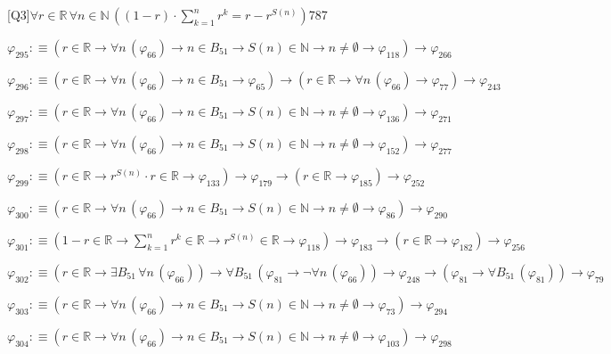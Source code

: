 \begin{fullproof}{[Q3]}{$\forall r \in \mathbb{R}\,\forall n \in \mathbb{N}\,((1 - r) \cdot {\textstyle\sum_{k=1}^{n} {{r}^{k}}} = r - {{r}^{S(n)}})$}{787}
\begin{abbrevlist}
\item $\varphi_{295} :\equiv (r \in \mathbb{R} \to \forall n\,(\varphi_{66}) \to n \in B_{51} \to S(n) \in \mathbb{N} \to n \neq \emptyset \to \varphi_{118}) \to \varphi_{266}$
\item $\varphi_{296} :\equiv (r \in \mathbb{R} \to \forall n\,(\varphi_{66}) \to n \in B_{51} \to \varphi_{65}) \to (r \in \mathbb{R} \to \forall n\,(\varphi_{66}) \to \varphi_{77}) \to \varphi_{243}$
\item $\varphi_{297} :\equiv (r \in \mathbb{R} \to \forall n\,(\varphi_{66}) \to n \in B_{51} \to S(n) \in \mathbb{N} \to n \neq \emptyset \to \varphi_{136}) \to \varphi_{271}$
\item $\varphi_{298} :\equiv (r \in \mathbb{R} \to \forall n\,(\varphi_{66}) \to n \in B_{51} \to S(n) \in \mathbb{N} \to n \neq \emptyset \to \varphi_{152}) \to \varphi_{277}$
\item $\varphi_{299} :\equiv (r \in \mathbb{R} \to {{r}^{S(n)}} \cdot r \in \mathbb{R} \to \varphi_{133}) \to \varphi_{179} \to (r \in \mathbb{R} \to \varphi_{185}) \to \varphi_{252}$
\item $\varphi_{300} :\equiv (r \in \mathbb{R} \to \forall n\,(\varphi_{66}) \to n \in B_{51} \to S(n) \in \mathbb{N} \to n \neq \emptyset \to \varphi_{86}) \to \varphi_{290}$
\item $\varphi_{301} :\equiv (1 - r \in \mathbb{R} \to {\textstyle\sum_{k=1}^{n} {{r}^{k}}} \in \mathbb{R} \to {{r}^{S(n)}} \in \mathbb{R} \to \varphi_{118}) \to \varphi_{183} \to (r \in \mathbb{R} \to \varphi_{182}) \to \varphi_{256}$
\item $\varphi_{302} :\equiv (r \in \mathbb{R} \to \exists B_{51}\,\forall n\,(\varphi_{66})) \to \forall B_{51}\,(\varphi_{81} \to \neg \forall n\,(\varphi_{66})) \to \varphi_{248} \to (\varphi_{81} \to \forall B_{51}\,(\varphi_{81})) \to \varphi_{79}$
\item $\varphi_{303} :\equiv (r \in \mathbb{R} \to \forall n\,(\varphi_{66}) \to n \in B_{51} \to S(n) \in \mathbb{N} \to n \neq \emptyset \to \varphi_{73}) \to \varphi_{294}$
\item $\varphi_{304} :\equiv (r \in \mathbb{R} \to \forall n\,(\varphi_{66}) \to n \in B_{51} \to S(n) \in \mathbb{N} \to n \neq \emptyset \to \varphi_{103}) \to \varphi_{298}$
\end{abbrevlist}
\end{fullproof}

